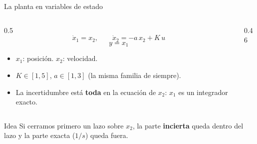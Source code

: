 \documentclass[aspectratio=169,11pt]{beamer}
\begin{document}
\begin{frame}{La planta en variables de estado}
  \small
  \begin{columns}[T]
  \begin{column}{0.5\textwidth}
    \[ \dot x_1=x_2,\qquad \dot x_2=-a\,x_2+K\,u \]
    \[ y=x_1 \]
    \begin{itemize}
      \item $x_1$: posición. $x_2$: velocidad.
      \item $K\in[1,5]$, $a\in[1,3]$ (la misma familia de siempre).
      \item La incertidumbre está \textbf{toda} en la ecuación de $x_2$: $x_1$ es un integrador exacto.
    \end{itemize}
  \end{column}
  \begin{column}{0.46\textwidth}
    \centering
  \end{column}
  \end{columns}
  \vspace{4pt}
  \begin{block}{Idea}
    Si cerramos primero un lazo sobre $x_2$, la parte \textbf{incierta} queda dentro del lazo y la parte exacta ($1/s$) queda fuera.
  \end{block}
\end{frame}
\end{document}
